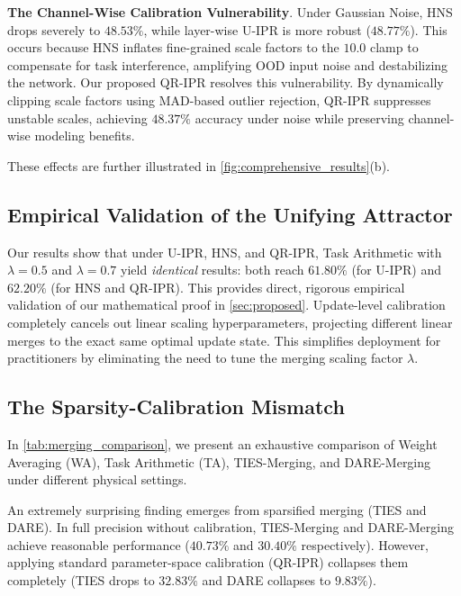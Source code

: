 \documentclass{article}
\theoremstyle{plain}
\theoremstyle{definition}
\theoremstyle{remark}
\begin{document}
\textbf{The Channel-Wise Calibration Vulnerability}. Under Gaussian Noise, HNS drops severely to $48.53\%$, while layer-wise U-IPR is more robust ($48.77\%$). This occurs because HNS inflates fine-grained scale factors to the $10.0$ clamp to compensate for task interference, amplifying OOD input noise and destabilizing the network. Our proposed QR-IPR resolves this vulnerability. By dynamically clipping scale factors using MAD-based outlier rejection, QR-IPR suppresses unstable scales, achieving $48.37\%$ accuracy under noise while preserving channel-wise modeling benefits.

These effects are further illustrated in \cref{fig:comprehensive_results}(b).

\vspace{-2.5mm}
\subsection{Empirical Validation of the Unifying Attractor}
\vspace{-0.3mm}
Our results show that under U-IPR, HNS, and QR-IPR, Task Arithmetic with $\lambda = 0.5$ and $\lambda = 0.7$ yield \emph{identical} results: both reach $61.80\%$ (for U-IPR) and $62.20\%$ (for HNS and QR-IPR). This provides direct, rigorous empirical validation of our mathematical proof in \cref{sec:proposed}. Update-level calibration completely cancels out linear scaling hyperparameters, projecting different linear merges to the exact same optimal update state. This simplifies deployment for practitioners by eliminating the need to tune the merging scaling factor $\lambda$.

\vspace{-2.5mm}
\subsection{The Sparsity-Calibration Mismatch}
\vspace{-0.3mm}
In \cref{tab:merging_comparison}, we present an exhaustive comparison of Weight Averaging (WA), Task Arithmetic (TA), TIES-Merging, and DARE-Merging under different physical settings.

An extremely surprising finding emerges from sparsified merging (TIES and DARE). In full precision without calibration, TIES-Merging and DARE-Merging achieve reasonable performance ($40.73\%$ and $30.40\%$ respectively). However, applying standard parameter-space calibration (QR-IPR) collapses them completely (TIES drops to $32.83\%$ and DARE collapses to $9.83\%$).
\end{document}
